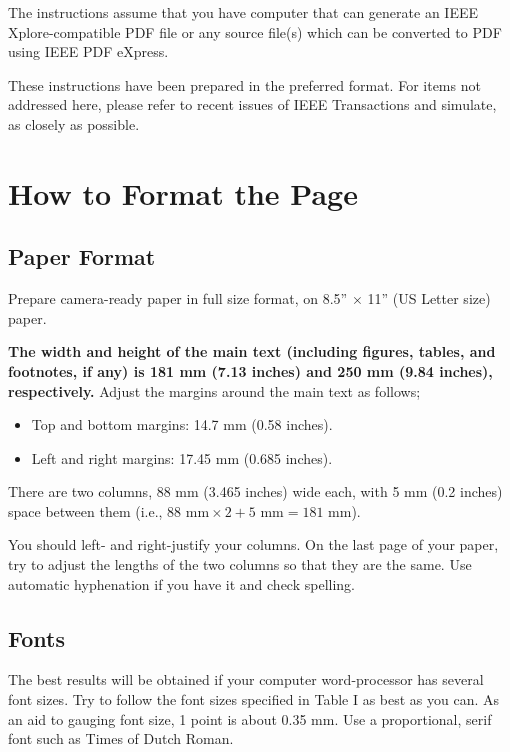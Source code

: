 \documentclass[twocolumn,letterpaper]{article}
\begin{document}
The instructions assume that you have computer that can generate an 
IEEE Xplore-compatible PDF file or any source file(s) which can be 
converted to PDF using IEEE PDF eXpress. 

These instructions have been prepared in the preferred format. For items
not addressed here, please refer to recent issues of IEEE Transactions
and simulate, as closely as possible.

\section{How to Format the Page}

\subsection{Paper Format} 
Prepare camera-ready paper in full size format, on 8.5'' $\times$ 11'' 
(US Letter size) paper.

\textbf{The width and height of the main text (including figures, tables, and 
footnotes, if any) is 181 mm (7.13 inches) and 250 mm (9.84 inches), 
respectively.}  Adjust the margins around the main text as follows;

\begin{itemize}
\item Top and bottom margins: 14.7 mm (0.58 inches).
\item Left and right margins: 17.45 mm (0.685 inches).
\end{itemize}

There are two columns, 88 mm (3.465 inches) wide each, with 5 mm (0.2 inches) 
space between them (i.e., $88\mbox{ mm}\times2+5\mbox{ mm}=181\mbox{ mm}$).

You should left- and right-justify your columns. On the last page of
your paper, try to adjust the lengths of the two columns so that they
are the same. Use automatic hyphenation if you have it and check
spelling.


\subsection{Fonts}
The best results will be obtained if your computer word-processor has
several font sizes. Try to follow the font sizes specified in Table I as
best as you can. As an aid to gauging font size, 1 point is about
0.35 mm. Use a proportional, serif font such as Times of Dutch Roman.
\end{document}
